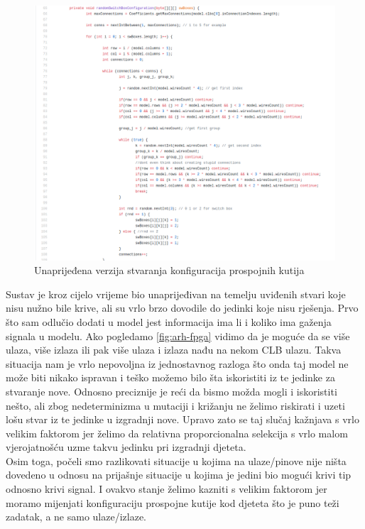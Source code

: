 \documentclass[times, utf8, zavrsni]{fer}
\begin{document}
	
	\begin{figure}[!htb]
		\centering
		\includegraphics[width=18cm]{slike/noviRandomizer.png}
		\caption{Unaprijeđena verzija stvaranja konfiguracija prospojnih kutija}
		\label{fig:novi-random}
	\end{figure} 
	
	
	
	Sustav je kroz cijelo vrijeme bio unaprijeđivan na temelju uviđenih stvari koje nisu nužno bile krive, ali su vrlo brzo dovodile do jedinki koje nisu rješenja. Prvo što sam odlučio dodati u model jest informacija ima li i koliko ima gaženja signala u modelu. Ako pogledamo \ref{fig:arh-fpga} vidimo da je moguće da se više ulaza, više izlaza ili pak više ulaza i izlaza nađu na nekom CLB ulazu. Takva situacija nam je vrlo nepovoljna iz jednostavnog razloga što onda taj model ne može biti nikako ispravan i teško možemo bilo šta iskoristiti iz te jedinke za stvaranje nove. Odnosno preciznije je reći da bismo možda mogli i iskoristiti nešto, ali zbog nedeterminizma u mutaciji i križanju ne želimo riskirati i uzeti lošu stvar iz te jedinke u izgradnji nove. Upravo zato se taj slučaj kažnjava s vrlo velikim faktorom jer želimo da relativna proporcionalna selekcija s vrlo malom vjerojatnošću uzme takvu jedinku pri izgradnji djeteta. \\ 
	Osim toga, počeli smo razlikovati situacije u kojima na ulaze/pinove nije ništa dovedeno u odnosu na prijašnje situacije u kojima je jedini bio mogući krivi tip odnosno krivi signal. I ovakvo stanje želimo kazniti s velikim faktorom jer moramo mijenjati konfiguraciju prospojne kutije kod djeteta što je puno teži zadatak, a ne samo ulaze/izlaze. 
	
\end{document}

